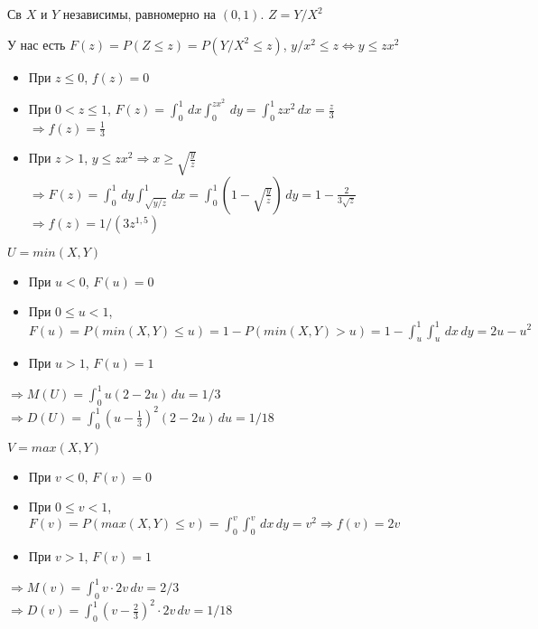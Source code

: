 \begin{exercise}[6]
	Св $X$ и $Y$ независимы, равномерно на $(0, 1)$. $Z=Y/X^2$
	
	 У нас есть $F(z) = P(Z \leq z) = P(Y/X^2 \leq z)$, $y/x^2\leq z \Leftrightarrow y \leq zx^2$
	 \begin{itemize}
	 	\item При $z \leq 0$, $f(z)=0$
	 	\item При $0 < z \leq 1$, $F(z) = \int_{0}^{1}\,dx\int_{0}^{zx^2}\,dy = \int_{0}^{1}zx^2\,dx = \frac{z}{3}$ \\ $\Rightarrow f(z) = \frac{1}{3}$
	 	\item При $z > 1$, $y \leq zx^2 \Rightarrow x \geq \sqrt{\frac{y}{z}}$ \\ $\Rightarrow F(z) = \int_{0}^{1}\,dy \int_{\sqrt{y/z}}^{1}\,dx = \int_{0}^{1}(1 - \sqrt{\frac{y}{z}})\,dy=1-\frac{2}{3\sqrt{z}}$ \\ $\Rightarrow f(z) = 1/(3z^{1,5})$
	 \end{itemize}
\end{exercise}

\begin{exercise}[7]
	\textbf{$U=min(X, Y)$}
	\begin{itemize}
		\item При $u < 0$, $F(u)=0$
		\item При $0 \leq u < 1$, $F(u) = P(min(X, Y) \leq u) = 1 - P(min(X, Y) > u) = 1 - \int_{u}^{1}\int_{u}^{1}\,dx\,dy = 2u-u^2$
		\item При $u>1$, $F(u)=1$
	\end{itemize}
	$\Rightarrow M(U) = \int_{0}^{1}u(2-2u)\,du=1/3$ \\
	$\Rightarrow D(U) = \int_{0}^{1}(u-\frac{1}{3})^2(2-2u)\,du = 1/18$
	
	\textbf{$V=max(X, Y)$}
	\begin{itemize}
		\item При $v < 0$, $F(v) = 0$
		\item При $0 \leq v < 1$, $F(v) = P(max(X, Y) \leq v) = \int_{0}^{v}\int_{0}^{v}\,dx\,dy = v^2 \Rightarrow f(v) = 2v$
		\item При $v > 1$, $F(v)=1$
	\end{itemize}
	$\Rightarrow M(v) = \int_{0}^{1}v\cdot 2v\,dv = 2/3$ \\
	$\Rightarrow D(v) = \int_{0}^{1}(v-\frac{2}{3})^2\cdot 2v\,dv = 1/18$
\end{exercise}

